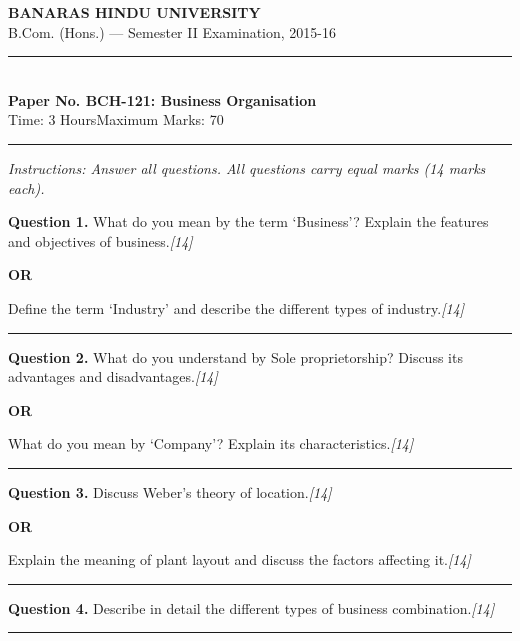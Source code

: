 \documentclass[11pt,a4paper]{article}
\newcommand{\pts}[1]{\hfill   \textit{[#1]}}
\begin{document}
\begin{center}
  {\large\bfseries BANARAS HINDU UNIVERSITY}\\[2pt]
  {\normalsize B.Com. (Hons.) --- Semester II Examination, 2015-16}\\[6pt]
  \rule{0.8\linewidth}{0.5pt}\\[6pt]
  {\large\bfseries Paper No. BCH-121: Business Organisation}\\[4pt]
  {\normalsize Time: 3 Hours\hfill Maximum Marks: 70}
\end{center}

\rule{\linewidth}{0.4pt}

\smallskip



\noindent   \textit{Instructions: Answer all questions. All questions carry equal marks (14 marks each).}

\bigskip




\noindent   \textbf{Question 1.}
What do you mean by the term `Business'? Explain the features and objectives of business.\pts{14}

\centerline{   \textbf{OR}}

Define the term `Industry' and describe the different types of industry.\pts{14}

\medskip\rule{\linewidth}{0.2pt}




\noindent   \textbf{Question 2.}
What do you understand by Sole proprietorship? Discuss its advantages and disadvantages.\pts{14}

\centerline{   \textbf{OR}}

What do you mean by `Company'? Explain its characteristics.\pts{14}

\medskip\rule{\linewidth}{0.2pt}




\noindent   \textbf{Question 3.}
Discuss Weber's theory of location.\pts{14}

\centerline{   \textbf{OR}}

Explain the meaning of plant layout and discuss the factors affecting it.\pts{14}

\medskip\rule{\linewidth}{0.2pt}




\noindent   \textbf{Question 4.}
Describe in detail the different types of business combination.\pts{14}

\medskip\rule{\linewidth}{0.2pt}
\end{document}
